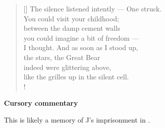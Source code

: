 \documentclass[a4paper,12pt,twoside,final]{book}
\begin{document}
\newpage


\settowidth{\versewidth}{The silence listened intently --- One struck.}

\begin{verse}[\versewidth]
  The silence listened intently --- One struck. \\
  You could visit your childhood; \\
  between the damp cement walls \\
  you could imagine a bit of freedom --- \\
  I thought. And as soon as I stood up, \\
  the stars, the Great Bear \\
  indeed were glittering above, \\
  like the grilles up in the silent cell. \\!
\end{verse}


\bigskip

\noindent \textbf{Cursory commentary}

\medskip

This is likely a memory of J's imprisonment in .

\newpage

\settowidth{\versewidth}{gondoltam. S hát hát amint fölállok}
\end{document}
